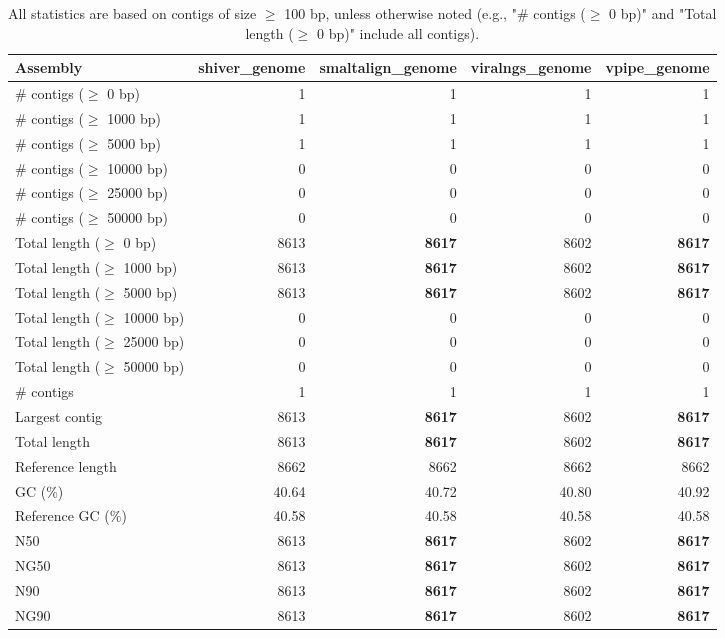 \documentclass[12pt,a4paper]{article}
\begin{document}
\begin{table}[ht]
\begin{center}
\caption{All statistics are based on contigs of size $\geq$ 100 bp, unless otherwise noted (e.g., "\# contigs ($\geq$ 0 bp)" and "Total length ($\geq$ 0 bp)" include all contigs).}
\begin{tabular}{|l*{4}{|r}|}
\hline
Assembly & shiver\_genome & smaltalign\_genome & viralngs\_genome & vpipe\_genome \\ \hline
\# contigs ($\geq$ 0 bp) & 1 & 1 & 1 & 1 \\ \hline
\# contigs ($\geq$ 1000 bp) & 1 & 1 & 1 & 1 \\ \hline
\# contigs ($\geq$ 5000 bp) & 1 & 1 & 1 & 1 \\ \hline
\# contigs ($\geq$ 10000 bp) & 0 & 0 & 0 & 0 \\ \hline
\# contigs ($\geq$ 25000 bp) & 0 & 0 & 0 & 0 \\ \hline
\# contigs ($\geq$ 50000 bp) & 0 & 0 & 0 & 0 \\ \hline
Total length ($\geq$ 0 bp) & 8613 & {\bf 8617} & 8602 & {\bf 8617} \\ \hline
Total length ($\geq$ 1000 bp) & 8613 & {\bf 8617} & 8602 & {\bf 8617} \\ \hline
Total length ($\geq$ 5000 bp) & 8613 & {\bf 8617} & 8602 & {\bf 8617} \\ \hline
Total length ($\geq$ 10000 bp) & 0 & 0 & 0 & 0 \\ \hline
Total length ($\geq$ 25000 bp) & 0 & 0 & 0 & 0 \\ \hline
Total length ($\geq$ 50000 bp) & 0 & 0 & 0 & 0 \\ \hline
\# contigs & 1 & 1 & 1 & 1 \\ \hline
Largest contig & 8613 & {\bf 8617} & 8602 & {\bf 8617} \\ \hline
Total length & 8613 & {\bf 8617} & 8602 & {\bf 8617} \\ \hline
Reference length & 8662 & 8662 & 8662 & 8662 \\ \hline
GC (\%) & 40.64 & 40.72 & 40.80 & 40.92 \\ \hline
Reference GC (\%) & 40.58 & 40.58 & 40.58 & 40.58 \\ \hline
N50 & 8613 & {\bf 8617} & 8602 & {\bf 8617} \\ \hline
NG50 & 8613 & {\bf 8617} & 8602 & {\bf 8617} \\ \hline
N90 & 8613 & {\bf 8617} & 8602 & {\bf 8617} \\ \hline
NG90 & 8613 & {\bf 8617} & 8602 & {\bf 8617} \\ \hline

\end{tabular}
\end{center}
\end{table}
\end{document}
